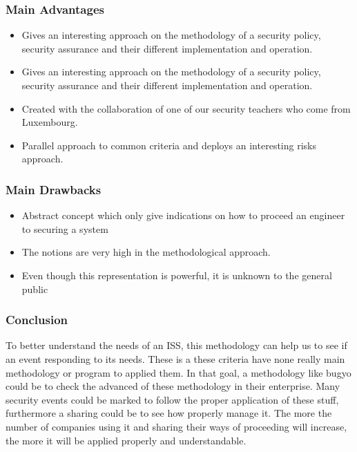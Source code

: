 \documentclass[12pt]{report}
\begin{document}
\subsubsection*{Main Advantages }
\begin{itemize}
	\item Gives an interesting approach on the methodology of a security policy, security assurance and their different implementation and operation.
\end{itemize}\par

\begin{itemize}
	\item Gives an interesting approach on the methodology of a security policy, security assurance and their different implementation and operation. \par
	\item Created with the collaboration of one of our security teachers who come from Luxembourg.  \par
	\item Parallel approach to common criteria and deploys an interesting risks approach.
\end{itemize}\par

\subsubsection*{Main Drawbacks }
\begin{itemize}
	\item Abstract concept which only give indications on how to proceed an engineer to securing a system\par
	\item The notions are very high in the methodological approach.\par
	\item Even though this representation is powerful, it is unknown to the general public
	
\end{itemize}\par

\subsubsection*{Conclusion }
\begin{justify}
To better understand the needs of an ISS, this methodology can help us to see if an event  responding to its needs.
These is a   these criteria have none really main methodology or program to applied them. 
In that goal, a methodology like bugyo could be  to check the advanced of these methodology in their enterprise. Many security events could be marked to follow the proper application of these stuff, furthermore a sharing  could be  to see how properly manage it.
The more the number of companies using it and sharing their ways of proceeding will increase,
the more it will be applied properly and understandable.
\end{justify}\par
\end{document}
